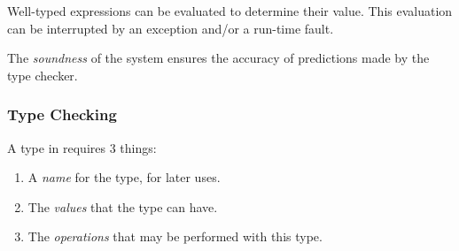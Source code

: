 Well-typed expressions can be evaluated to determine their value.
This evaluation can be interrupted by an exception and/or a run-time fault.

\begin{definition}[Soundness]\label{def:Functional_Lang-Soundness}
  The \emph{soundness} of the  system ensures the accuracy of predictions made by the type checker.
\end{definition}

\subsubsection{Type Checking}\label{subsubsec:Functional-SML-Type_Checking}
A type in  requires 3 things:
\begin{enumerate}[noitemsep]
\item A \emph{name} for the type, for later uses.
\item The \emph{values} that the type can have.
\item The \emph{operations} that may be performed with this type.
\end{enumerate}


